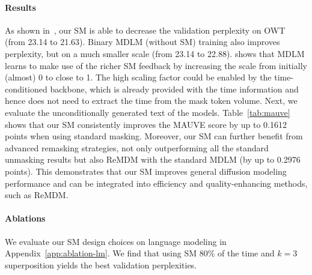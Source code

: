 \documentclass{article}
\begin{document}
\paragraph{Results}
As shown in~, our SM is able to decrease the validation perplexity on OWT (from 23.14 to 21.63).
% 
Binary MDLM (without SM) training also improves perplexity, but on a much smaller scale (from 23.14 to 22.88).
% 
 shows that MDLM learns to make use of the richer SM feedback by increasing the scale from initially (almost) 0 to close to 1. 
% 
The high scaling factor could be enabled by the time-conditioned backbone, which is already provided with the time information and hence does not need to extract the time from the mask token volume. 
%
Next, we evaluate the unconditionally generated text of the models. 
% 
Table~\ref{tab:mauve} shows that our SM consistently improves the MAUVE score by up to 0.1612 points when using standard masking. 
% 
Moreover, our SM can further benefit from advanced remasking strategies, not only outperforming all the standard unmasking results but also ReMDM with the standard MDLM (by up to 0.2976 points). 
% 
This demonstrates that our SM improves general diffusion modeling performance and can be integrated into efficiency and quality-enhancing methods, such as ReMDM.

\paragraph{Ablations}
We evaluate our SM design choices on language modeling in Appendix~\ref{app:ablation-lm}. 
We find that using SM 80\% of the time and $k=3$ superposition yields the best validation perplexities.  
\end{document}
